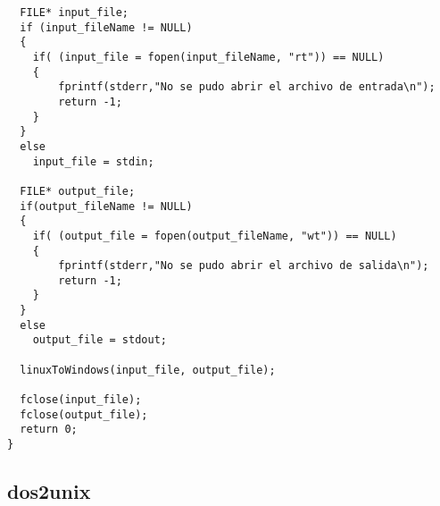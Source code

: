 \documentclass[a4paper,11pt]{article}
\begin{document}
\begin{verbatim}
  FILE* input_file;
  if (input_fileName != NULL)
  {
    if( (input_file = fopen(input_fileName, "rt")) == NULL)
    {
        fprintf(stderr,"No se pudo abrir el archivo de entrada\n");
        return -1;
    }
  }
  else
    input_file = stdin;

  FILE* output_file;
  if(output_fileName != NULL)
  {
    if( (output_file = fopen(output_fileName, "wt")) == NULL)
    {
        fprintf(stderr,"No se pudo abrir el archivo de salida\n");
        return -1;
    }
  }
  else
    output_file = stdout;

  linuxToWindows(input_file, output_file);

  fclose(input_file);
  fclose(output_file);
  return 0;
}
\end{verbatim}

\subsection{dos2unix}
\end{document}

